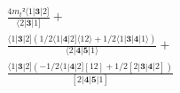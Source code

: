\documentclass[varwidth, border=5pt]{standalone}
\begin{document}
\begin{my}
$\begin{gathered}
\scriptscriptstyle\frac{4m_t²⟨1|𝟑|2]}{⟨2|𝟑|1]} +\\
\scriptscriptstyle\frac{⟨1|𝟑|2](1/2⟨1|𝟒|2]⟨12⟩+1/2⟨1|𝟑|𝟒|1⟩)}{⟨2|𝟒|𝟓|1⟩} +\\
\scriptscriptstyle\frac{⟨1|𝟑|2](-1/2⟨1|𝟒|2][12]+1/2[2|𝟑|𝟒|2])}{[2|𝟒|𝟓|1]} \phantom{+}
\end{gathered}$
\end{my}
\end{document}
